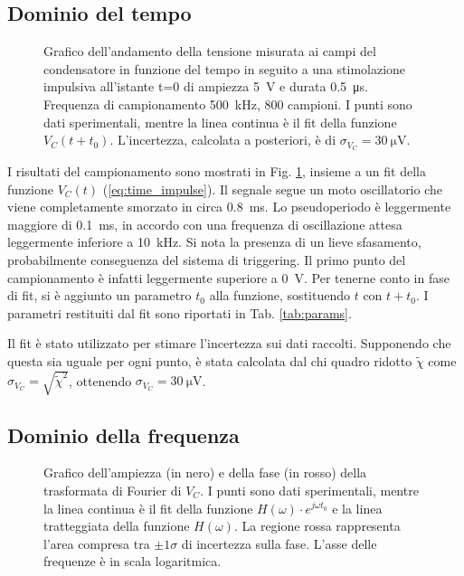 \documentclass[12pt,a4paper, twocolumn]{article}
\begin{document}
\subsection{Dominio del tempo}
\begin{figure}[t]
\centering

\caption{Grafico dell'andamento della tensione misurata ai campi del condensatore in funzione del tempo in seguito a una stimolazione impulsiva all'istante t=0 di ampiezza \SI{5}{\volt} e durata \SI{0.5}{\micro\second}. Frequenza di campionamento \SI{500}{\kilo\hertz}, 800 campioni. I punti sono dati sperimentali, mentre la linea continua è il fit della funzione $V_C(t+t_0)$. L'incertezza, calcolata a posteriori, è di $\sigma_{V_C} = \SI{30}{\micro\volt}$.}
\label{fig:plot-time}
\end{figure}

I risultati del campionamento sono mostrati in Fig. \ref{fig:plot-time}, insieme a un fit della funzione $V_C(t)$ (\ref{eq:time_impulse}). Il segnale segue un moto oscillatorio che viene completamente smorzato in circa \SI{0.8}{\milli\second}. Lo pseudoperiodo è leggermente maggiore di \SI{0.1}{\milli\second}, in accordo con una frequenza di oscillazione attesa leggermente inferiore a \SI{10}{\kilo\hertz}. Si nota la presenza di un lieve sfasamento, probabilmente conseguenza del sistema di triggering. Il primo punto del campionamento è infatti leggermente superiore a \SI{0}{\volt}. Per tenerne conto in fase di fit, si è aggiunto un parametro $t_0$ alla funzione, sostituendo $t$ con $t+t_0$. I parametri restituiti dal fit sono riportati in Tab. \ref{tab:params}.

Il fit è stato utilizzato per stimare l'incertezza sui dati raccolti. Supponendo che questa sia uguale per ogni punto, è stata calcolata dal chi quadro ridotto $\tilde{\chi}$ come $\sigma_{V_C} = \sqrt{\tilde{\chi}^2}$, ottenendo $\sigma_{V_C} = \SI{30}{\micro\volt}$.

\subsection{Dominio della frequenza}
\begin{figure}[t]

\caption{Grafico dell'ampiezza (in nero) e della fase (in rosso) della trasformata di Fourier di $V_C$. I punti sono dati sperimentali, mentre la linea continua è il fit della funzione $H(\omega) \cdot e^{j\omega t_0}$ e la linea tratteggiata della funzione $H(\omega)$. La regione rossa rappresenta l'area compresa tra $\pm 1 \sigma$ di incertezza sulla fase. L'asse delle frequenze è in scala logaritmica.}
\label{fig:plot-freqs}
\end{figure}
\end{document}

